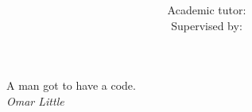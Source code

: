 \documentclass[paper=a4, fontsize=12pt, twoside=semi, abstracton, listof=totoc, toc=left]{scrartcl}
\title{
	\normalfont
	\small \scshape{\myuni} \\ [25pt]
	\horrule{0.5pt} \\ [0.4cm]
	\Huge \mytitle \\[0.2cm]
	\horrule{2pt} \\ [10.5cm]
}
\author{
	\myauthor \\
	\small Academic tutor: \mytutor \\
	\small Supervised by: \mysupervisor
}
\date{\mydate}
\newenvironment{mydedication}
	{\clearpage           %
	\thispagestyle{empty}%
	\vspace*{\stretch{1}}%
	\itshape             %
	\raggedleft          %
	}
	{\par %
	\vspace{\stretch{3}} %
	\clearpage           %
	}
\begin{document}

\newpage

\clearpage
\maketitle
\thispagestyle{empty}
\addtocounter{page}{-1}

\begin{mydedication}
	A man got to have a code. \\[0.1cm]
	\emph{Omar Little}
\end{mydedication}






\tableofcontents










\begin{appendices}



\end{appendices}{}



\printbibliography[heading=bibintoc]
\setcounter{secnumdepth}{0}
\end{document}
